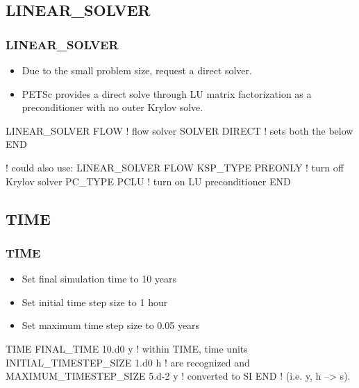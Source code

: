 \documentclass{beamer}
\newcommand\redcomment[1]{{{\color{red} #1}}}
\newcommand\bluecomment[1]{{{\color{blue} #1}}}
\newcommand\greencomment[1]{{{\color{green} #1}}}
\begin{document}
\subsection{LINEAR\_SOLVER}

\begin{frame}[fragile]\frametitle{LINEAR\_SOLVER}

\begin{itemize}
\item Due to the small problem size, request a direct solver.
\item PETSc provides a direct solve through LU matrix factorization as a preconditioner with no outer Krylov solve.
\end{itemize}

\begin{semiverbatim}

LINEAR_SOLVER FLOW     \bluecomment{! flow solver}
  SOLVER DIRECT        \bluecomment{! sets both the below}
END

\bluecomment{! could also use:}
LINEAR_SOLVER FLOW
  KSP_TYPE PREONLY     \bluecomment{! turn off Krylov solver}
  PC_TYPE PCLU         \bluecomment{! turn on LU preconditioner}
END

\end{semiverbatim}

\end{frame}

\subsection{TIME}

\begin{frame}[fragile]\frametitle{TIME}

\begin{itemize}
\item Set final simulation time to 10 years
\item Set initial time step size to 1 hour
\item Set maximum time step size to 0.05 years
\end{itemize}


\begin{semiverbatim}

TIME
  FINAL_TIME 10.d0 \redcomment{y}            \bluecomment{! within TIME, time units}
  INITIAL_TIMESTEP_SIZE 1.d0 \redcomment{h}  \bluecomment{!   are recognized and}
  MAXIMUM_TIMESTEP_SIZE 5.d-2 \redcomment{y} \bluecomment{!   converted to SI}
END                             \bluecomment{! (i.e. \redcomment{y}, \redcomment{h} --> \greencomment{s}).}
\end{semiverbatim}

\end{frame}
\end{document}
